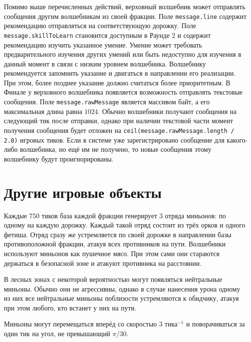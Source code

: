 
Помимо выше перечисленных действий, верховный волшебник может отправлять сообщения другим волшебникам из своей фракции. Поле
\texttt{message.line} содержит рекомендацию отправляться на соответствующую дорожку. Поле \texttt{message.skillToLearn} становится доступным
в Раунде $2$ и содержит рекомендацию изучить указанное умение. Умение может требовать предварительного изучения других умений или быть
недоступно для изучения в данный момент в связи с низким уровнем волшебника. Волшебнику рекомендуется запомнить указание и двигаться в
направлении его реализации. При этом, более позднее указание должно считаться более приоритетным. В Финале у верховного волшебника
появляется возможность отправлять текстовые сообщения. Поле \texttt{message.rawMessage} является массивом байт, а его максимальная длина
равна $1024$. Обычно волшебники получают сообщения на следующий тик после отправки, однако при наличии текстовой части момент получения
сообщения будет отложен на \texttt{ceil(message.rawMessage.length / 2.0)} игровых тиков. Если в системе уже зарегистрировано сообщение для
какого-либо волшебника, но ещё им не получено, то новые сообщения этому волшебнику будут проигнорированы.

\section{Другие игровые объекты}

Каждые $750$ тиков база каждой фракции генерирует $3$ отряда миньонов: по одному на каждую дорожку. Каждый такой отряд состоит из трёх орков
и одного фетиша. Отряд сразу же устремляется по своей дорожке в направлении базы противоположной фракции, атакуя всех противников на пути.
Волшебники используют миньонов как пушечное мясо. При этом сами они стараются держаться в безопасной зоне и атакуют противника на
расстоянии.

В лесных зонах с некоторой вероятностью могут появляться нейтральные миньоны. Обычно они не агрессивны, однако в случае нанесения урона
одному из них все нейтральные миньоны поблизости устремляются к обидчику, атакуя при этом любого, кто встанет у них на пути.

Миньоны могут перемещаться вперёд со скоростью $3$ тика$^{-1}$ и поворачиваться за один тик на угол, не превышающий $\pi / 30$.

